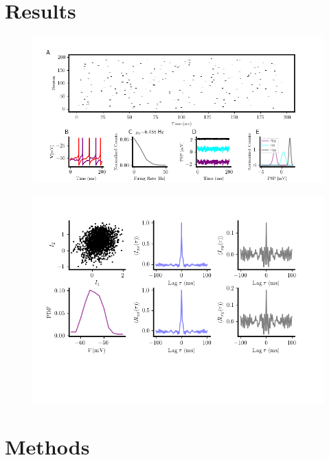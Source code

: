 \documentclass{ucetd}
\begin{document}
\section{Results}




\begin{figure}[t!]
\centering
\includegraphics[width=175mm]{figure-2}
\caption{}
\end{figure}

\begin{figure}[t!]
\centering
\includegraphics[width=150mm]{figure-3}
\caption{}
\end{figure}



\section{Methods}
\end{document}
